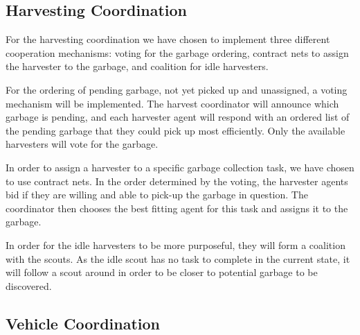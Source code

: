 \subsection{Harvesting Coordination}

For the harvesting coordination we have chosen to implement three different cooperation mechanisms: voting for the garbage ordering, contract nets to assign the harvester to the garbage, and coalition for idle harvesters. 

For the ordering of pending garbage, not yet picked up and unassigned, a voting mechanism will be implemented. The harvest coordinator will announce which garbage is pending, and each harvester agent will respond with an ordered list of the pending garbage that they could pick up most efficiently. Only the available harvesters will vote for the garbage. 

In order to assign a harvester to a specific garbage collection task, we have chosen to use contract nets. In the order determined by the voting, the harvester agents bid if they are willing and able to pick-up the garbage in question. The coordinator then chooses the best fitting agent for this task and assigns it to the garbage. 

In order for the idle harvesters to be more purposeful, they will form a coalition with the scouts. As the idle scout has no task to complete in the current state, it will follow a scout around in order to be closer to potential garbage to be discovered. 

\subsection{Vehicle Coordination}